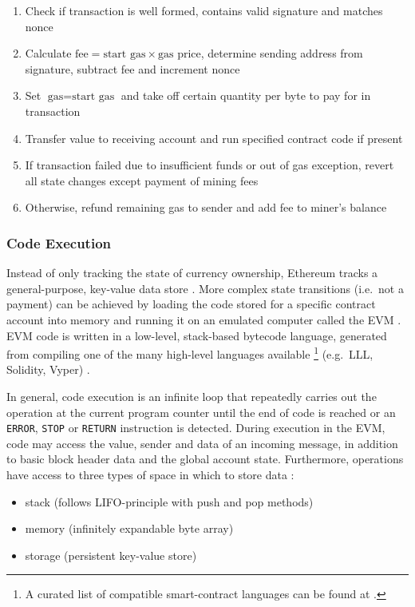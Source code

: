 \begin{enumerate}
  \item Check if transaction is well formed, contains valid signature and matches nonce
  \item Calculate $\text{fee} = \text{start gas} \times \text{gas price}$, determine sending address from signature, subtract fee and increment nonce
  \item Set $\text{gas} = \text{start gas}$ and take off certain quantity per byte to pay for in transaction
  \item Transfer value to receiving account and run specified contract code if present
  \item If transaction failed due to insufficient funds or out of gas exception, revert all state changes except payment of mining fees
  \item Otherwise, refund remaining gas to sender and add fee to miner's balance
\end{enumerate}

\subsubsection{Code Execution}
Instead of only tracking the state of currency ownership, Ethereum tracks a general-purpose, key-value data store \cite[p.~28]{Antonopoulos.2018}. More complex state transitions (i.e.~not a payment) can be achieved by loading the code stored for a specific contract account into memory and running it on an emulated computer called the \ac{EVM} \cite[p.~57]{Antonopoulos.2018}. \ac{EVM} code is written in a low-level, stack-based bytecode language, generated from compiling one of the many high-level languages available \footnote{A curated list of compatible smart-contract languages can be found at \cite{smartContractLanguages}.} (e.g.~LLL, Solidity, Vyper) \cite[p.~22]{ethereumWhitepaperGitHub} \cite[p.~29]{Antonopoulos.2018}. 

In general, code execution is an infinite loop that repeatedly carries out the operation at the current program counter until the end of code is reached or an \texttt{ERROR}, \texttt{STOP} or \texttt{RETURN} instruction is detected. During execution in the \ac{EVM}, code may access the value, sender and data of an incoming message, in addition to basic block header data and the global account state. Furthermore, operations have access to three types of space in which to store data \cite[p.~22]{ethereumWhitepaperGitHub}:

\begin{itemize}
  \item stack (follows LIFO-principle with push and pop methods)
  \item memory (infinitely expandable byte array)
  \item storage (persistent key-value store)
\end{itemize}

